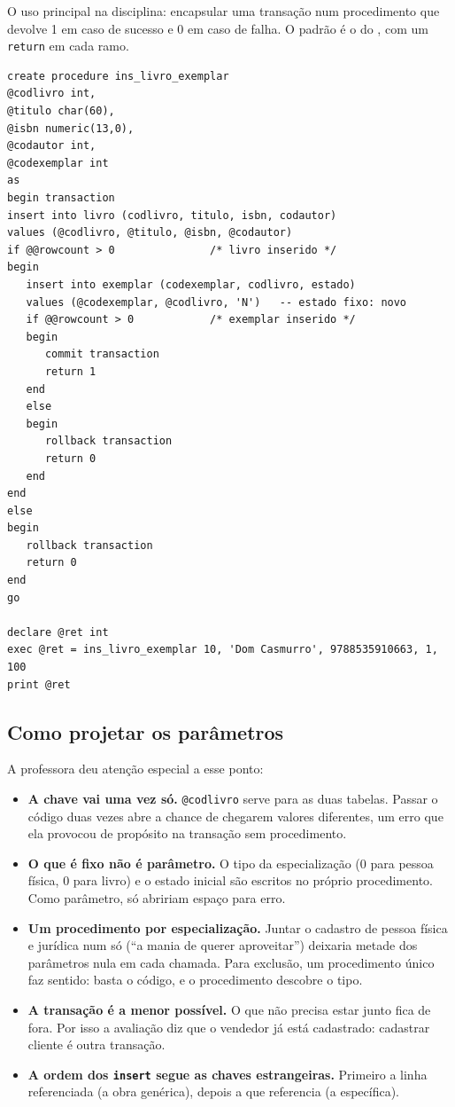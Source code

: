 O uso principal na disciplina: encapsular uma transação num
procedimento que devolve 1 em caso de sucesso e 0 em caso de falha. O
padrão é o do , com um \texttt{return} em cada ramo.

\begin{lstlisting}[caption={Cadastro de livro com exemplar: obra genérica e específica numa transação.}]
create procedure ins_livro_exemplar
@codlivro int,
@titulo char(60),
@isbn numeric(13,0),
@codautor int,
@codexemplar int
as
begin transaction
insert into livro (codlivro, titulo, isbn, codautor)
values (@codlivro, @titulo, @isbn, @codautor)
if @@rowcount > 0               /* livro inserido */
begin
   insert into exemplar (codexemplar, codlivro, estado)
   values (@codexemplar, @codlivro, 'N')   -- estado fixo: novo
   if @@rowcount > 0            /* exemplar inserido */
   begin
      commit transaction
      return 1
   end
   else
   begin
      rollback transaction
      return 0
   end
end
else
begin
   rollback transaction
   return 0
end
go

declare @ret int
exec @ret = ins_livro_exemplar 10, 'Dom Casmurro', 9788535910663, 1, 100
print @ret
\end{lstlisting}

\subsection{Como projetar os parâmetros}

A professora deu atenção especial a esse ponto:

\begin{itemize}
	\item \textbf{A chave vai uma vez só.} \texttt{@codlivro} serve para as
	duas tabelas. Passar o código duas vezes abre a chance de chegarem
	valores diferentes, um erro que ela provocou de propósito na transação
	sem procedimento.
	\item \textbf{O que é fixo não é parâmetro.} O tipo da especialização
	(0 para pessoa física, 0 para livro) e o estado inicial são escritos
	no próprio procedimento. Como parâmetro, só abririam espaço para erro.
	\item \textbf{Um procedimento por especialização.} Juntar o cadastro de
	pessoa física e jurídica num só (``a mania de querer aproveitar'')
	deixaria metade dos parâmetros nula em cada chamada. Para exclusão,
	um procedimento único faz sentido: basta o código, e o procedimento
	descobre o tipo.
	\item \textbf{A transação é a menor possível.} O que não precisa estar
	junto fica de fora. Por isso a avaliação diz que o vendedor já está
	cadastrado: cadastrar cliente é outra transação.
	\item \textbf{A ordem dos \texttt{insert} segue as chaves
	estrangeiras.} Primeiro a linha referenciada (a obra genérica), depois
	a que referencia (a específica).
\end{itemize}

